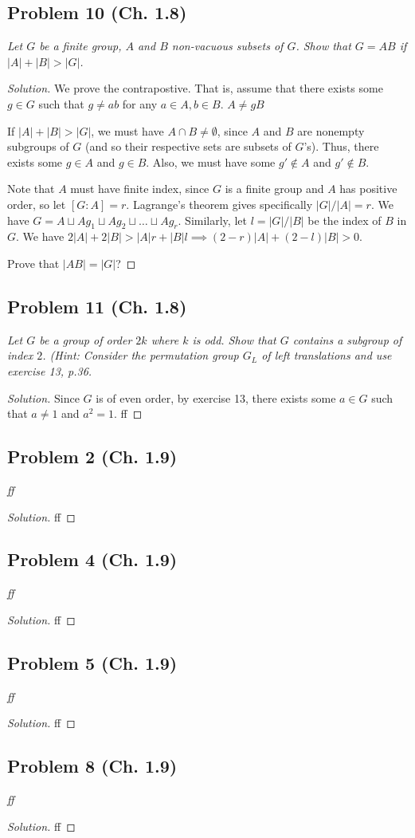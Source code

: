 \documentclass{article}
\begin{document}
\subsection*{Problem 10 (Ch. 1.8)}
{\it Let $G$ be a finite group, $A$ and $B$ non-vacuous subsets of $G$.
Show that $G = AB$ if $|A| + |B| > |G|$.}
\begin{proof}[Solution]\let\qed\relax
	We prove the contrapostive.
	That is, assume that there exists some $g \in G$ such that
	$g \neq ab$ for any $a \in A, b \in B$.
	$A \neq gB$

	If $|A| + |B| > |G|$, we must have $A \cap B \neq \emptyset$,
	since $A$ and $B$ are nonempty subgroups of $G$
	(and so their respective sets are subsets of $G$'s).
	Thus, there exists some $g \in A$ and $g \in B$.
	Also, we must have some $g' \not\in A$ and $g' \not\in B$.

	Note that $A$ must have finite index,
	since $G$ is a finite group and $A$ has positive order,
	so let $[G : A] = r$.
	Lagrange's theorem gives specifically $|G|/|A| = r$.
	We have $G = A \sqcup Ag_1 \sqcup Ag_2 \sqcup \dots \sqcup Ag_r$.
	Similarly, let $l = |G|/|B|$ be the index of $B$ in $G$.
	We have $2|A| + 2|B| > |A|r + |B|l \implies (2-r)|A| + (2-l)|B| > 0$.

	Prove that $|AB| = |G|$?
\end{proof}

\subsection*{Problem 11 (Ch. 1.8)}
{\it Let $G$ be a group of order $2k$ where $k$ is odd.
Show that $G$ contains a subgroup of index $2$.
(\emph{Hint:} Consider the permutation group $G_L$ of
left translations and use exercise 13, p.36.}
\begin{proof}[Solution]\let\qed\relax
	Since $G$ is of even order, by exercise 13,
	there exists some $a \in G$ such that $a \neq 1$ and $a^2 = 1$.
	ff
\end{proof}

\subsection*{Problem 2 (Ch. 1.9)}
{\it ff}
\begin{proof}[Solution]\let\qed\relax
	ff
\end{proof}


\subsection*{Problem 4 (Ch. 1.9)}
{\it ff}
\begin{proof}[Solution]\let\qed\relax
	ff
\end{proof}

\subsection*{Problem 5 (Ch. 1.9)}
{\it ff}
\begin{proof}[Solution]\let\qed\relax
	ff
\end{proof}

\subsection*{Problem 8 (Ch. 1.9)}
{\it ff}
\begin{proof}[Solution]\let\qed\relax
	ff
\end{proof}
\end{document}
